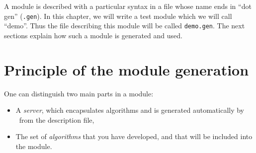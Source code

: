%
%
%
%
%
%
%

A module is described with a particular syntax  in a file whose name ends
in ``dot   gen'' ({\tt .gen}).  In this   chapter, we will  write  a test
module which we will call ``demo''.  Thus the file describing this module
will be  called  {\tt demo.gen}.  The next  sections  explain  how such a
module is generated and used.

\section{Principle of the module generation}
\label{sec|session|principle}

One can distinguish two main parts in a module:

\begin{itemize}
   \item A {\em server}, which encapsulates algorithms and is generated
automatically by \GenoM\ from the description file,
   \item The set of {\em algorithms} that you have developed, and that
will be included into the module.
\end{itemize}

